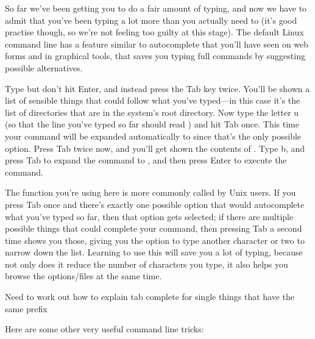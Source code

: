 So far we've been getting you to do a fair amount of typing, and now we have to admit that you've been typing a lot more than you actually need to (it's good practise though, so we're not feeling too guilty at this stage). The default Linux command line has a feature similar to autocomplete that you'll have seen on web forms and in graphical tools, that saves you typing full commands by suggesting possible alternatives. 

Type  but don't hit Enter, and instead press the Tab key twice. You'll be shown a list of sensible things that could follow what you've typed---in this case it's the list of directories that are in the system's root directory. Now type the letter u (so that the line you've typed so far should read ) and hit Tab once. This time your command will be expanded automatically to  since that's the only possible option. Press Tab twice now, and you'll get shown the contents of . Type b, and press Tab to expand the command to , and then press Enter to execute the command.

The  function you're using here is more commonly called  by Unix users. If you press Tab once and there's exactly one possible option that would autocomplete what you've typed so far, then that option gets selected; if there are multiple possible things that could complete your command, then pressing Tab a second time shows you those, giving you the option to type another character or two to narrow down the list. Learning to use this will save you a lot of typing, because not only does it reduce the number of characters you type, it also helps you browse the options/files at the same time. 

\begin{note}
Need to work out how to explain tab complete for single things that have the same prefix
\end{note}


Here are some other very useful command line tricks:

